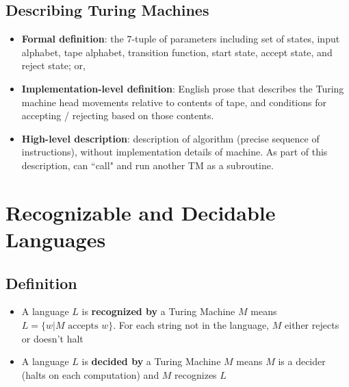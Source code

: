 \documentclass{article}
\begin{document}
\subsection{Describing Turing Machines}
\begin{itemize}
\item {\bf Formal definition}: the $7$-tuple of parameters including set of states, 
input alphabet, tape alphabet, transition function, start state, accept state, and reject state; or,
\item {\bf Implementation-level definition}: English prose that describes the Turing machine head 
movements relative to contents of tape, and conditions for accepting / rejecting based on those contents.
\item {\bf High-level description}: description of algorithm (precise sequence of instructions), 
without implementation details of machine. As part of this description, can ``call" and run 
another TM as a subroutine.
\end{itemize}
\section{Recognizable and Decidable Languages}
\subsection{Definition}
\label{sec:decide}
\begin{itemize}
    \item A language $L$ is \textbf{recognized by} a Turing Machine $M$ means $L=\{w\vert M\text{ accepts }w\}$. For each string not in the language, $M$ either rejects or doesn't halt
    \item A language $L$ is \textbf{decided by} a Turing Machine $M$ means $M$ is a decider (halts on each computation) and $M$ recognizes $L$
\end{itemize}
\end{document}

